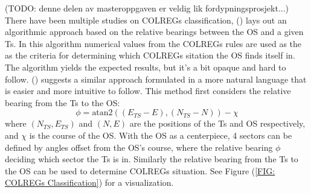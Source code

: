 (TODO: denne delen av masteroppgaven er veldig lik fordypningsprosjekt...)
There have been multiple studies on \gls{COLREGs} classification, (\cite{woerner2016multi}) lays out an algorithmic approach based on the
relative bearings between the \gls{OS} and a given \gls{Ts}. In this algorithm numerical values from the \gls{COLREGs} rules are used as the
as the criteria for determining which \gls{COLREGs} sitation the \gls{OS} finds itself in. The algorithm yields the expected results,
but it's a bit opaque and hard to follow. (\cite{tam2010collision}) suggests a similar approach formulated in a more natural language that is easier
and more intuitive to follow. This method first considers the relative bearing from the \gls{Ts} to the \gls{OS}:
\begin{equation}
    \phi = \textrm{atan2}((E_{TS} - E) , (N_{TS} - N)) - \chi
\end{equation}
where $(N_{TS}, E_{TS})$ and $(N, E)$ are the positions of the \gls{Ts} and \gls{OS} respectively, and $\chi$ is the course of the \gls{OS}.
With the \gls{OS} as a centerpiece, 4 sectors can be defined by angles offset from the \gls{OS}'s course, where
the relative bearing $\phi$ deciding which sector the \gls{Ts} is in. Similarly the relative bearing from the \gls{Ts} to the \gls{OS} can be
used to determine \gls{COLREGs} situation. See Figure (\ref{FIG: COLREGs Classification}) for a visualization.

